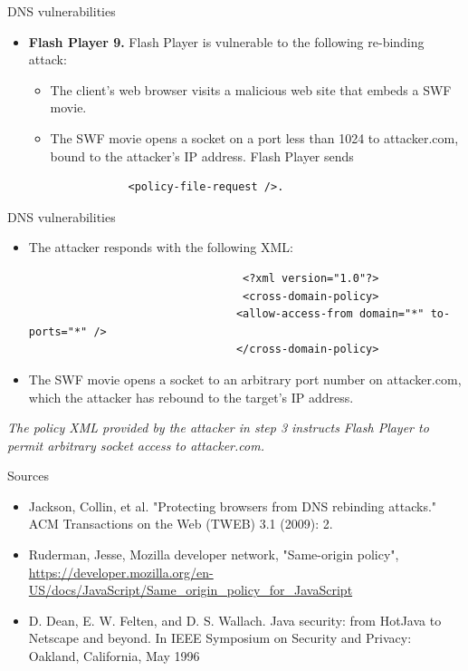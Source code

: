 \documentclass{beamer}
\begin{document}
\begin{frame}[fragile]{DNS vulnerabilities}
    \begin{itemize}
        \item \textbf{Flash Player 9.}  Flash Player is vulnerable to the following re-binding attack:
        \begin{itemize}
            \item The client’s web browser visits a malicious web site that embeds a SWF movie.
			\item The SWF movie opens a socket on a port less than 1024 to attacker.com, bound to the attacker’s IP address. Flash Player sends 
            \begin{verbatim}
			<policy-file-request />.
			\end{verbatim}
         \end{itemize}
    \end{itemize}
\end{frame}

\begin{frame}[fragile]{DNS vulnerabilities}
     \begin{itemize}
        \item The attacker responds with the following XML:			        
            \begin{verbatim}
								 <?xml version="1.0"?> 
								 <cross-domain-policy>
								<allow-access-from domain="*" to-ports="*" />
								</cross-domain-policy> 
            \end{verbatim}
        \item The SWF movie opens a socket to an arbitrary port number on attacker.com, which the attacker has rebound to the target’s IP address.
     \end{itemize}
    \textit{The policy XML provided by the attacker in step 3 instructs Flash Player to permit arbitrary socket access to attacker.com.}
\end{frame}

\begin{frame}{Sources}
    \begin{itemize}
        \item Jackson, Collin, et al. "Protecting browsers from DNS rebinding attacks." ACM Transactions on the Web (TWEB) 3.1 (2009): 2.
        \item Ruderman, Jesse, Mozilla developer network, "Same-origin policy",
        \url{https://developer.mozilla.org/en-US/docs/JavaScript/Same_origin_policy_for_JavaScript}
        \item D. Dean, E. W. Felten, and D. S. Wallach. Java security: from
        HotJava to Netscape and beyond. In IEEE Symposium on Security and
        Privacy: Oakland, California, May 1996
    \end{itemize}
\end{frame}
\end{document}
